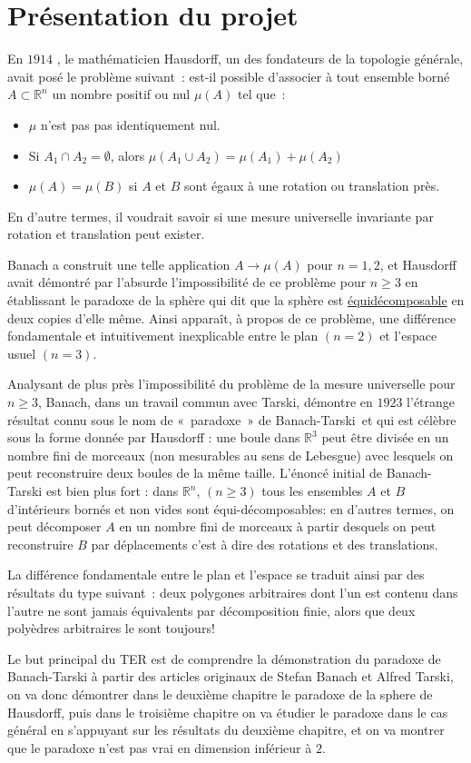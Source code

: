 \chapter{Présentation du projet}

En $1914$ \cite{cite3}, le mathématicien Hausdorff, un des fondateurs de la topologie générale, avait posé le problème suivant : est-il possible d'associer à tout ensemble borné $A \subset \mathbb{R}^n$  un nombre positif ou nul $\mu(A)$ tel que :
\begin{itemize}
  \item $\mu$ n'est pas pas identiquement nul.
  \item Si $A_1 \cap A_2 = \emptyset$, alors $\mu(A_1 \cup  A_2) = \mu(A_1) + \mu(A_2)$
  \item $\mu(A) = \mu(B)$ si $A$ et $B$ sont égaux à une rotation ou translation près.
\end{itemize}
En d'autre termes, il voudrait savoir si une mesure universelle invariante par rotation et translation peut exister.\par
Banach a construit une telle application $A \rightarrow \mu(A)$ pour $n = 1, 2$\cite{cite4}, et Hausdorff avait démontré par l'absurde l'impossibilité de ce problème pour $n \ge 3$ en établissant le paradoxe de la sphère qui dit que la sphère est \hyperref[ed]{équidécomposable} en deux copies d'elle même. Ainsi apparaît, à propos de ce problème, une différence fondamentale et intuitivement inexplicable entre le plan $(n=2)$ et l'espace usuel $(n=3)$.\par Analysant de plus près l'impossibilité du problème de la mesure universelle pour $n \ge 3$, Banach, dans un travail commun avec Tarski\cite{cite0}, démontre en $1923$ l'étrange résultat connu sous le nom de « paradoxe » de Banach-Tarski et qui est célèbre sous la forme donnée par Hausdorff : une boule dans $\mathbb{R}^3$
peut être divisée en un nombre fini de morceaux (non mesurables au sens de Lebesgue) avec lesquels on
peut reconstruire deux boules de la même taille. L’énoncé initial de Banach-Tarski est bien
plus fort : dans $\mathbb{R}^n$, $(n\ge 3)$ tous les ensembles $A$ et $B$ d’intérieurs bornés et non vides sont
équi-décomposables: en d’autres termes, on peut décomposer $A$ en un nombre fini de
morceaux à partir desquels on peut reconstruire $B$ par déplacements c'est à dire des rotations et des translations.\par
La différence fondamentale entre le plan et l'espace se traduit ainsi par des résultats du type suivant : deux polygones arbitraires dont l'un est contenu dans l'autre ne sont jamais équivalents par décomposition finie, alors que deux polyèdres arbitraires le sont toujours!\par
Le but principal du TER est de comprendre la démonstration du paradoxe de Banach-Tarski à partir des articles originaux de Stefan Banach et Alfred Tarski, on va donc démontrer dans le deuxième chapitre le paradoxe de la sphere de Hausdorff, puis dans le troisième chapitre on va étudier le paradoxe dans le cas général en s'appuyant sur les résultats du deuxième chapitre, et on va montrer que le paradoxe n'est pas vrai en dimension inférieur à $2$.



